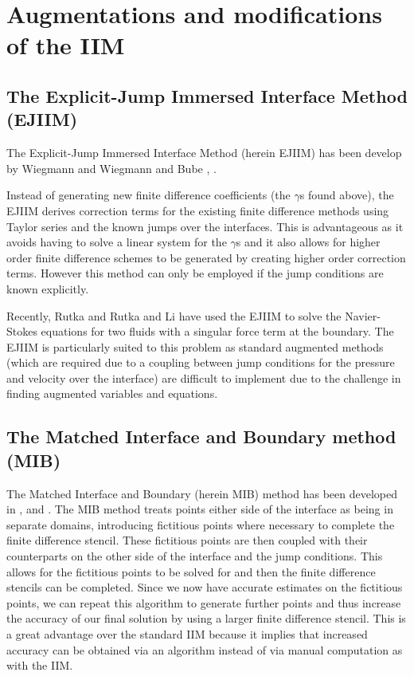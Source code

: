 \section{Augmentations and modifications of the IIM}

\subsection{The Explicit-Jump Immersed Interface Method (EJIIM)}

The Explicit-Jump Immersed Interface Method (herein EJIIM) has been develop by Wiegmann \cite{wiegmann98} and Wiegmann and Bube \cite{wiegmannbube98}, \cite{wiegmannbube00}.

Instead of generating new finite difference coefficients (the $\gamma$s found above), the EJIIM derives correction terms for the existing finite difference methods using Taylor series and the known jumps over the interfaces.
This is advantageous as it avoids having to solve a linear system for the $\gamma$s and it also allows for higher order finite difference schemes to be generated by creating higher order correction terms.
However this method can only be employed if the jump conditions are known explicitly.

Recently, Rutka \cite{rutka08} and Rutka and Li \cite{rutkali08} have used the EJIIM to solve the Navier-Stokes equations for two fluids with a singular force term at the boundary.
The EJIIM is particularly suited to this problem as standard augmented methods (which are required due to a coupling between jump conditions for the pressure and velocity over the interface) are difficult to implement due to the challenge in finding augmented variables and equations.

\subsection{The Matched Interface and Boundary method (MIB)}

The Matched Interface and Boundary (herein MIB) method has been developed in \cite{zhaowei04}, \cite{zhouwei06} and \cite{zhouetal06}.
The MIB method treats points either side of the interface as being in separate domains, introducing fictitious points where necessary to complete the finite difference stencil.
These fictitious points are then coupled with their counterparts on the other side of the interface and the jump conditions.
This allows for the fictitious points to be solved for and then the finite difference stencils can be completed.
Since we now have accurate estimates on the fictitious points, we can repeat this algorithm to generate further points and thus increase the accuracy of our final solution by using a larger finite difference stencil.
This is a great advantage over the standard IIM because it implies that increased accuracy can be obtained via an algorithm instead of via manual computation as with the IIM.

